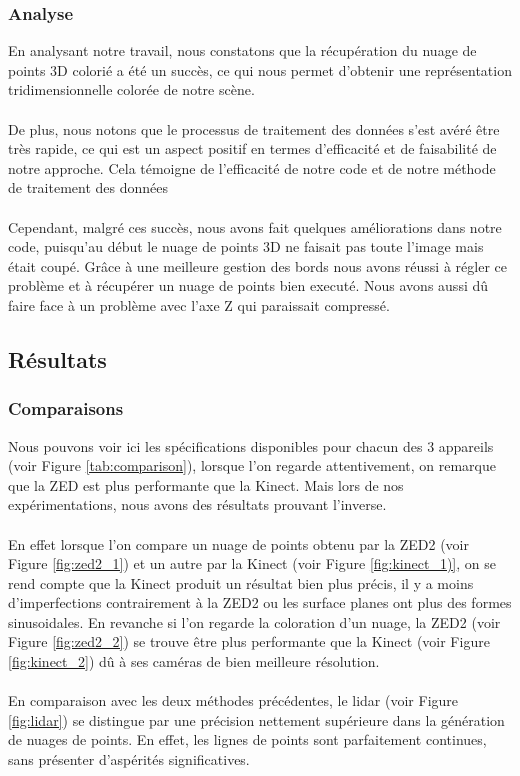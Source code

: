     \subsubsection{Analyse}
        \normalsize{
            En analysant notre travail, nous constatons que la récupération du nuage de points 3D colorié a été un succès, ce qui nous permet d'obtenir une représentation tridimensionnelle colorée de notre scène.
        }
        \\ \\
        \normalsize{
            De plus, nous notons que le processus de traitement des données s'est avéré être très rapide, ce qui est un aspect positif en termes d'efficacité et de faisabilité de notre approche. Cela témoigne de l'efficacité de notre code et de notre méthode de traitement des données
        }
        \\ \\
        \normalsize{
            Cependant, malgré ces succès, nous avons fait quelques améliorations dans notre code, puisqu'au début le nuage de points 3D ne faisait pas toute l'image mais était coupé. Grâce à une meilleure gestion des bords nous avons réussi à régler ce problème et à récupérer un nuage de points bien executé. Nous avons aussi dû faire face à un problème avec l'axe Z qui paraissait compressé.
        }


\subsection{Résultats}
    \subsubsection{Comparaisons}
        \normalsize{
            Nous pouvons voir ici les spécifications disponibles pour chacun des 3 appareils (voir Figure \ref{tab:comparison}), lorsque l'on regarde attentivement, on remarque que la ZED est plus performante que la Kinect. Mais lors de nos expérimentations, nous avons des résultats prouvant l'inverse.
        }
        \\ \\
        \normalsize{
            En effet lorsque l'on compare un nuage de points obtenu par la ZED2 (voir Figure \ref{fig:zed2_1}) et un autre par la Kinect (voir Figure \ref{fig:kinect_1)}, on se rend compte que la Kinect produit un résultat bien plus précis, il y a moins d'imperfections contrairement à la ZED2 ou les surface planes ont plus des formes sinusoidales. En revanche si l'on regarde la coloration d'un nuage, la ZED2 (voir Figure \ref{fig:zed2_2}) se trouve être plus performante que la Kinect (voir Figure \ref{fig:kinect_2}) dû à ses caméras de bien meilleure résolution.
        }
        \\ \\
        \normalsize{
           En comparaison avec les deux méthodes précédentes, le lidar (voir Figure \ref{fig:lidar}) se distingue par une précision nettement supérieure dans la génération de nuages de points. En effet, les lignes de points sont parfaitement continues, sans présenter d'aspérités significatives.
        }

